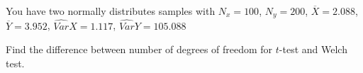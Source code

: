 
\begin{question}
You have two normally distributes samples with \(N_x=100\), \(N_y=200\), \(\overline{X} = 2.088\), \(\overline{Y} = 3.952\), \(\widehat{Var}{X} = 1.117\), \(\widehat{Var}{Y} = 105.088\)

Find the difference between number of degrees of freedom for \(t\)-test and Welch test.
\end{question}


